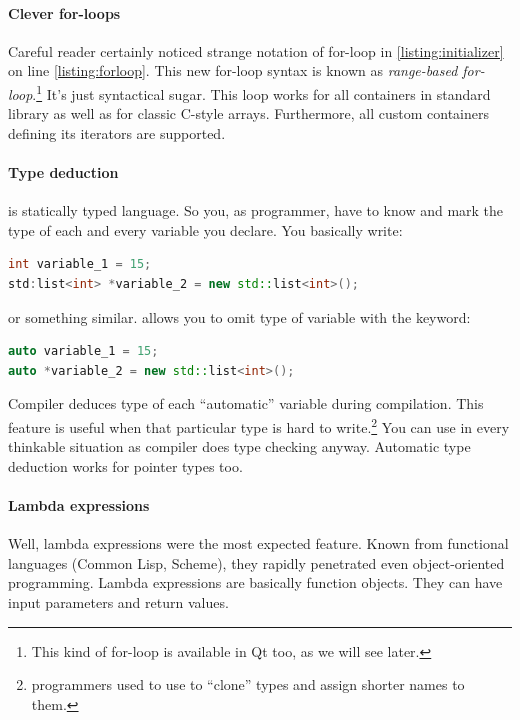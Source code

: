 \paragraph*{Clever for-loops}
Careful reader certainly noticed strange notation of for-loop in \autoref{listing:initializer} on line \ref{listing:forloop}. This new for-loop syntax is known as \textit{range-based for-loop}.\footnote{This kind of for-loop is available in Qt too, as we will see later.} It's just syntactical sugar. This loop works for all containers in standard library as well as for classic C-style arrays. Furthermore, all custom containers defining its iterators are supported.

\paragraph*{Type deduction}
\cpp{} is statically typed language. So you, as programmer, have to know and mark the type of each and every variable you declare. You basically write:
\begin{lstlisting}[firstnumber=1,language=cpp]
int variable_1 = 15;
std:list<int> *variable_2 = new std::list<int>();
\end{lstlisting}
or something similar.  allows you to omit type of variable with the keyword:
\begin{lstlisting}[firstnumber=1,language=cpp]
auto variable_1 = 15;
auto *variable_2 = new std::list<int>();
\end{lstlisting}
Compiler deduces type of each \enquote{automatic} variable during compilation. This feature is useful when that particular type is hard to write.\footnote{\cpp{} programmers used to use to \enquote{clone} types and assign shorter names to them.} You can use in every thinkable situation as compiler does type checking anyway. Automatic type deduction works for pointer types too.

\paragraph*{Lambda expressions}
Well, lambda expressions were the most expected feature. Known from functional languages (\eg Common Lisp, Scheme), they rapidly penetrated even object-oriented programming. Lambda expressions are basically function objects. They can have input parameters and return values.

